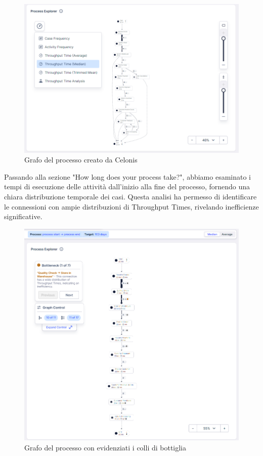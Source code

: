 \documentclass{article}
\begin{document}
\begin{figure}[H]
    \centering
    \includegraphics[width=\textwidth]{imgCelonis/PrimaSimulazione/GrafoSimulazione.png}
    \caption{Grafo del processo creato da Celonis}
    \label{fig:Grafo-processo_Celonis}
\end{figure}
Passando alla sezione "How long does your process take?", abbiamo esaminato i tempi di esecuzione delle attività dall'inizio alla fine del processo, fornendo una chiara distribuzione temporale dei casi. Questa analisi ha permesso di identificare le connessioni con ampie distribuzioni di Throughput Times, rivelando inefficienze significative.\\
\begin{figure}[H]
    \centering
    \includegraphics[width=\textwidth]{imgCelonis/PrimaSimulazione/GrafoColliDiBottiglia.png}
    \caption{Grafo del processo con evidenziati i colli di bottiglia}
    \label{fig:Grafo-colli-di-bottiglia}
\end{figure}
\end{document}
